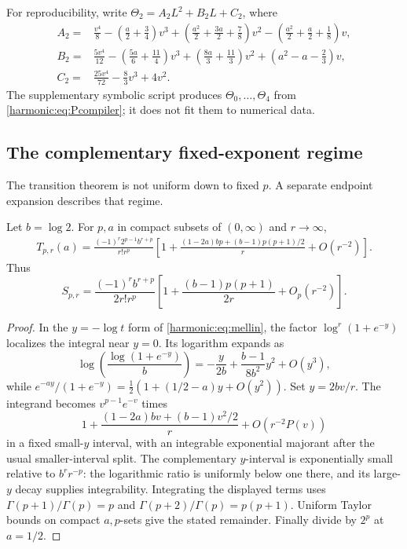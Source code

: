 For reproducibility, write $\Theta_2=A_2L^2+B_2L+C_2$, where
\begin{align*}
 A_2={}&\frac{v^4}{8}-\left(\frac a2+\frac34\right)v^3
 +\left(\frac{a^2}{2}+\frac{3a}{2}+\frac78\right)v^2
 -\left(\frac{a^2}{2}+\frac a2+\frac18\right)v,\\
 B_2={}&\frac{5v^4}{12}-\left(\frac{5a}{6}+\frac{11}{4}\right)v^3
 +\left(\frac{8a}{3}+\frac{11}{3}\right)v^2
 +\left(a^2-a-\frac23\right)v,\\
 C_2={}&\frac{25v^4}{72}-\frac83v^3+4v^2.
\end{align*}
The supplementary symbolic script produces $\Theta_0,\ldots,\Theta_4$ from \eqref{harmonic:eq:Pcompiler}; it does not fit them to numerical data.

\subsection{The complementary fixed-exponent regime}
\label{harmonic:sec:fixedp}
The transition theorem is not uniform down to fixed $p$. A separate endpoint expansion describes that regime.

\begin{theorem}\label{harmonic:thm:fixedp}
Let $b=\log2$. For $p,a$ in compact subsets of $(0,\infty)$ and $r\to\infty$,
\begin{align}\label{harmonic:eq:fixedp}
 T_{p,r}(a)=\frac{(-1)^r2^{p-1}b^{r+p}}{r!r^p}
 \left[1+\frac{(1-2a)bp+(b-1)p(p+1)/2}{r}+O(r^{-2})\right].
\end{align}
Thus
\begin{equation}\label{harmonic:eq:fixedpS}
 S_{p,r}=\frac{(-1)^r b^{r+p}}{2r!r^p}
 \left[1+\frac{(b-1)p(p+1)}{2r}+O_p(r^{-2})\right].
\end{equation}
\end{theorem}
\begin{proof}
In the $y=-\log t$ form of \eqref{harmonic:eq:mellin}, the factor
$\log^r(1+e^{-y})$ localizes the integral near $y=0$. Its logarithm expands as
\[
 \log\left(\frac{\log(1+e^{-y})}{b}\right)
 =-\frac{y}{2b}+\frac{b-1}{8b^2}y^2+O(y^3),
\]
while
$e^{-ay}/(1+e^{-y})=\tfrac12(1+(1/2-a)y+O(y^2))$.
Set $y=2bv/r$. The integrand becomes $v^{p-1}e^{-v}$ times
\[
 1+\frac{(1-2a)bv+(b-1)v^2/2}{r}+O\!\left(r^{-2}P(v)\right)
\]
in a fixed small-$y$ interval, with an integrable exponential majorant after the usual smaller-interval split. The complementary $y$-interval is exponentially small relative to $b^r r^{-p}$: the logarithmic ratio is uniformly below one there, and its large-$y$ decay supplies integrability. Integrating the displayed terms uses
$\Gamma(p+1)/\Gamma(p)=p$ and $\Gamma(p+2)/\Gamma(p)=p(p+1)$. Uniform Taylor bounds on compact $a,p$-sets give the stated remainder. Finally divide by $2^p$ at $a=1/2$.
\end{proof}

